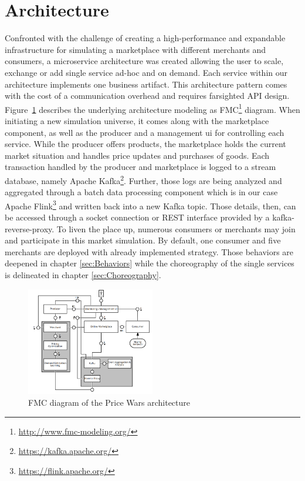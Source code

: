 \section{Architecture}
\label{sec:Architecture}
%
Confronted with the challenge of creating a high-performance and expandable infrastructure for simulating a marketplace with different merchants and consumers, a microservice architecture was created allowing the user to scale, exchange or add single service ad-hoc and on demand. Each service within our architecture implements one business artifact. This architecture pattern comes with the cost of a communication overhead and requires farsighted API design.\\

Figure~\ref{fig:fmc} describes the underlying architecture modeling as FMC\footnote{\url{http://www.fmc-modeling.org/}} diagram. When initiating a new simulation universe, it comes along with the marketplace component, as well as the producer and a management ui for controlling each service. While the producer offers products, the marketplace holds the current market situation and handles price updates and purchases of goods. Each transaction handled by the producer and marketplace is logged to a stream database, namely Apache Kafka\footnote{\url{https://kafka.apache.org/}}. Further, those logs are being analyzed and aggregated through a batch data processing component which is in our case Apache Flink\footnote{\url{https://flink.apache.org/}} and written back into a new Kafka topic. Those details, then, can be accessed through a socket connection or REST interface provided by a kafka-reverse-proxy. 
To liven the place up, numerous consumers or merchants may join and participate in this market simulation. By default, one consumer and five merchants are deployed with already implemented strategy. Those behaviors are deepened in chapter \ref{sec:Behaviors} while the choreography of the single services is delineated in chapter \ref{sec:Choreography}.

%
\begin{figure}[h]
    \centering
    \includegraphics[width=0.5\textwidth]{images/architecture_fmc.png}
    \caption{FMC diagram of the Price Wars architecture}
    \label{fig:fmc}
\end{figure}
%